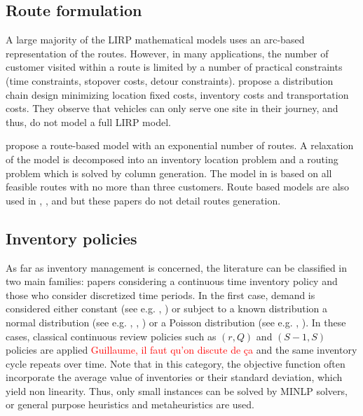 \documentclass[a4paper,10pt]{article}
\begin{document}
\begin{linenumbers}
\subsection{Route formulation}
\label{sec:r}

A large majority of the LIRP mathematical models uses an arc-based representation of the routes. 
However, in many applications, the number of customer visited within a route is limited by a number of practical constraints (time constraints, stopover costs, detour constraints). \cite{MaDav05} propose a distribution chain design  minimizing location fixed costs, inventory costs and transportation costs. They observe that vehicles can only serve one site in their journey, and thus, do not model a full LIRP model. 

\cite{Guerrero2013} propose a route-based model with an exponential number of routes. A relaxation of the model is decomposed into an inventory location problem and a routing problem which is solved by column generation. 
The model in \cite{Lehrlaly2016} is based on all feasible routes with no more than three customers. 
Route based models are also used in \cite{LiGuoWangFu2013}, \cite{LiuChenLiLiu2015},  \cite{Deng2016} and \cite{hiassat_genetic_2017} 
but these papers do not detail routes generation.

\subsection{Inventory policies}
\label{sec:i}

As far as inventory management is concerned, the literature can be classified in two main families: papers considering a continuous time inventory policy 
and those who consider discretized time periods. 
In the first case, demand is considered either constant (see e.g. \cite{AhmSed2012}, \cite{Deng2016}) or subject to a known distribution a 
normal distribution (see e.g. \cite{Nekooghadirli2014}, \cite{Zhalechian2016}, \cite{Saragih2018}) or a Poisson distribution (see e.g. \cite{Asadi2018}, \cite{HabibiAS2018}). In these cases, classical continuous review policies such as $(r,Q)$ and $(S-1,S)$ policies are applied \textcolor{red}{Guillaume, il faut qu'on discute de ça} and the same inventory cycle repeats over time. Note that in this category, the objective function often incorporate the average value of inventories or their standard deviation, which yield non linearity. Thus, only small instances can be solved by MINLP solvers, or general purpose heuristics and metaheuristics are used. 



\end{linenumbers}
\end{document}
